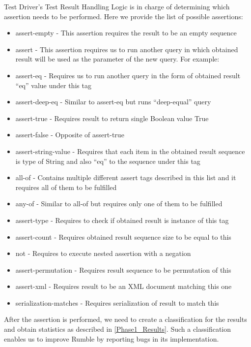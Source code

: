 Test Driver's Test Result Handling Logic is in charge of determining which assertion needs to be performed. Here we provide the list of possible assertions:

\begin{itemize}
	\item assert-empty - This assertion requires the result to be an empty sequence
	\item assert - This assertion requires us to run another query in which obtained result will be used as the parameter of the new query. For example:
	
	\item assert-eq - Requires us to run another query in the form of obtained result ``eq'' value under this tag
	\item assert-deep-eq - Similar to assert-eq but runs ``deep-equal'' query
	\item assert-true - Requires result to return single Boolean value True
	\item assert-false - Opposite of assert-true
	\item assert-string-value - Requires that each item in the obtained result sequence is type of String and also ``eq'' to the sequence under this tag
	\item all-of - Contains multiple different assert tags described in this list and it requires all of them to be fulfilled 
	\item any-of - Similar to all-of but requires only one of them to be fulfilled
	\item assert-type - Requires to check if obtained result is instance of this tag
	\item assert-count - Requires obtained result sequence size to be equal to this
	\item not - Requires to execute nested assertion with a negation
	\item assert-permutation - Requires result sequence to be permutation of this
	\item assert-xml - Requires result to be an XML document matching this one
	\item serialization-matches - Requires serialization of result to match this
\end{itemize}

After the assertion is performed, we need to create a classification for the results and obtain statistics as described in \ref{Phase1_Results}. Such a classification enables us to improve Rumble by reporting bugs in its implementation.

